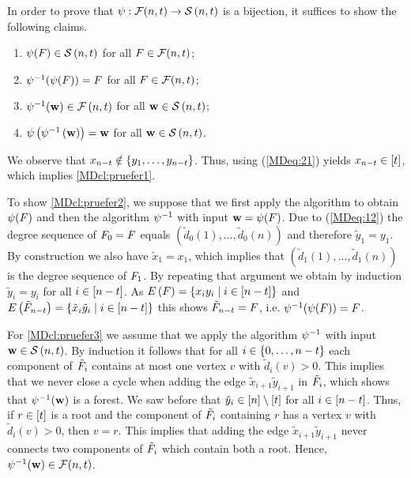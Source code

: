 In order to prove that $\psi:\mathcal{F}(n,t)\to \mathcal{S}\left(n, t\right)$ is a bijection, it suffices to show the following claims.
\begin{enumerate}[label=(\roman*)]
	\item \label{MDcl:pruefer1}
	$\psi(F)\in \mathcal{S}\left(n, t\right)$ for all $F\in \mathcal{F}(n, t)$;
	\item \label{MDcl:pruefer2} $\psi^{-1}(\psi(F))=F$ for all $F\in \mathcal{F}(n, t)$;
	\item \label{MDcl:pruefer3}
	$\psi^{-1}(\mathbf{w})\in\mathcal{F}\left(n, t\right)$ for all $\mathbf{w}\in \mathcal{S}\left(n, t\right)$;
	\item \label{MDcl:pruefer4}
	$\psi\left(\psi^{-1}\left(\mathbf{w}\right)\right)=\mathbf{w}$ for all $\mathbf{w}\in \mathcal{S}\left(n, t\right)$.
\end{enumerate}
We observe that $x_{n-t}\notin \left\{y_1, \ldots, y_{n-t}\right\}$. Thus, using (\ref{MDeq:21}) yields $x_{n-t}\in[t]$, which implies \ref{MDcl:pruefer1}.

To show \ref{MDcl:pruefer2}, we suppose that we first apply the algorithm to obtain $\psi(F)$ and then the algorithm $\psi^{-1}$ with input $\mathbf{w}=\psi(F)$. Due to (\ref{MDeq:12}) the degree sequence of $F_0=F$ equals $\left(\tilde{d}_0(1), \ldots, \tilde{d}_0(n)\right)$ and therefore $\tilde{y}_1=y_1$. By construction we also have $\tilde{x}_1=x_1$, which implies that $\left(\tilde{d}_1(1), \ldots, \tilde{d}_1(n)\right)$ is the degree sequence of $F_1$. By repeating that argument we obtain by induction $\tilde{y}_i=y_i$ for all $i\in[n-t]$. As $E\left(F\right)=\left\{x_iy_i \mid i\in[n-t]\right\}$ and $E\left(\tilde{F}_{n-t}\right)=\left\{\tilde{x}_i\tilde{y}_i \mid i\in[n-t]\right\}$ this shows $\tilde{F}_{n-t}=F$, i.e. $\psi^{-1}(\psi(F))=F$.

For \ref{MDcl:pruefer3} we assume that we apply the algorithm $\psi^{-1}$ with input $\mathbf{w}\in \mathcal{S}\left(n, t\right)$. By induction it follows that for all $i\in\left\{0, \ldots, n-t\right\}$ each component of $\tilde{F}_i$ contains at most one vertex $v$ with $\tilde{d}_i(v)>0$. This implies that we never close a cycle when adding the edge $\tilde{x}_{i+1}\tilde{y}_{i+1}$ in $\tilde{F}_i$, which shows that $\psi^{-1}(\mathbf{w})$ is a forest. We saw before that $\tilde{y}_i\in[n]\setminus[t]$ for all $i\in[n-t]$. Thus, if $r\in[t]$ is a root and the component of $\tilde{F}_i$ containing $r$ has a vertex $v$ with $\tilde{d}_i(v)>0$, then $v=r$. This implies that adding the edge $\tilde{x}_{i+1}\tilde{y}_{i+1}$ never connects two components of $\tilde{F}_i$ which contain both a root. Hence, $\psi^{-1}(\mathbf{w})\in \mathcal{F}(n,t)$. 

